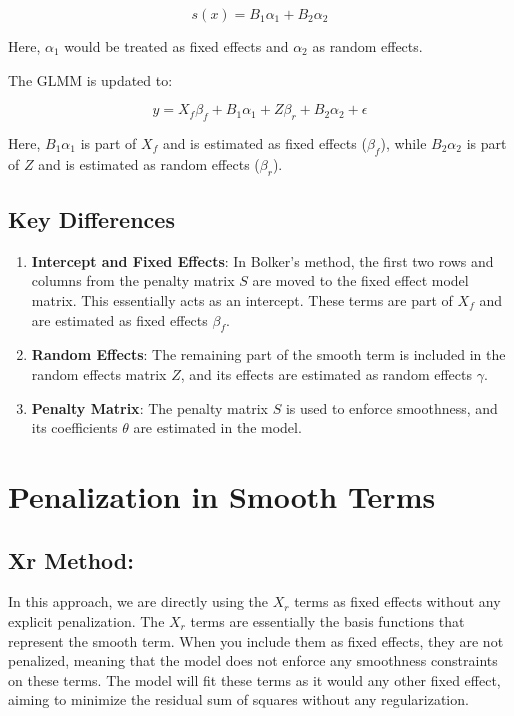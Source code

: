 \documentclass{article}
\begin{document}
\[
s(x) = B_1 \alpha_1 + B_2 \alpha_2
\]

Here, \(\alpha_1\) would be treated as fixed effects and \(\alpha_2\) as random effects.


The GLMM is updated to:

\[
y = X_f \beta_f + B_1 \alpha_1 + Z \beta_r + B_2 \alpha_2 + \epsilon
\]

Here, \(B_1 \alpha_1\) is part of \(X_f\) and is estimated as fixed effects (\(\beta_f\)), while \(B_2 \alpha_2\) is part of \(Z\) and is estimated as random effects (\(\beta_r\)).


\subsection{Key Differences}

\begin{enumerate}
    \item \textbf{Intercept and Fixed Effects}: In Bolker's method, the first two rows and columns from the penalty matrix \(S\) are moved to the fixed effect model matrix. This essentially acts as an intercept. These terms are part of \(X_f\) and are estimated as fixed effects \(\beta_f\).
    
    \item \textbf{Random Effects}: The remaining part of the smooth term is included in the random effects matrix \(Z\), and its effects are estimated as random effects \(\gamma\).
    
    \item \textbf{Penalty Matrix}: The penalty matrix \(S\) is used to enforce smoothness, and its coefficients \(\theta\) are estimated in the model.
\end{enumerate}


\section{Penalization in Smooth Terms}

\subsection{Xr Method:}

In this approach, we are directly using the \(X_r\) terms as fixed effects without any explicit penalization. The \(X_r\) terms are essentially the basis functions that represent the smooth term. When you include them as fixed effects, they are not penalized, meaning that the model does not enforce any smoothness constraints on these terms. The model will fit these terms as it would any other fixed effect, aiming to minimize the residual sum of squares without any regularization.
\end{document}
